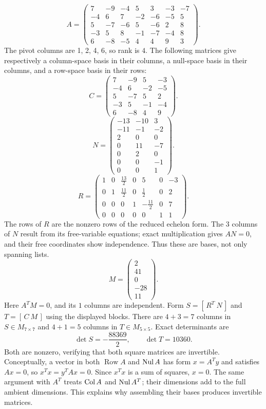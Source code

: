 \[ A=\begin{pmatrix}7&-9&-4&5&3&-3&-7\\-4&6&7&-2&-6&-5&5\\5&-7&-6&5&-6&2&8\\-3&5&8&-1&-7&-4&8\\6&-8&-5&4&4&9&3\end{pmatrix}.\]
The pivot columns are 1, 2, 4, 6, so rank is $4$. The following matrices give respectively a column-space basis in their columns, a null-space basis in their columns, and a row-space basis in their rows:
\[ C=\begin{pmatrix}7&-9&5&-3\\-4&6&-2&-5\\5&-7&5&2\\-3&5&-1&-4\\6&-8&4&9\end{pmatrix}.\]
\[ N=\begin{pmatrix}-13&-10&3\\-11&-1&-2\\2&0&0\\0&11&-7\\0&2&0\\0&0&-1\\0&0&1\end{pmatrix}.\]
\[ R=\begin{pmatrix}1&0&\frac{13}{2}&0&5&0&-3\\0&1&\frac{11}{2}&0&\frac{1}{2}&0&2\\0&0&0&1&- \frac{11}{2}&0&7\\0&0&0&0&0&1&1\end{pmatrix}.\]
The rows of $R$ are the nonzero rows of the reduced echelon form. The $3$ columns of $N$ result from its free-variable equations; exact multiplication gives $AN=0$, and their free coordinates show independence. Thus these are bases, not only spanning lists.
\[ M=\begin{pmatrix}2\\41\\0\\-28\\11\end{pmatrix}.\]
Here $A^TM=0$, and its $1$ columns are independent. Form $S=[\,R^T\ N\,]$ and $T=[\,C\ M\,]$ using the displayed blocks. There are $4+3=7$ columns in $S\in M_{7\times 7}$ and $4+1=5$ columns in $T\in M_{5\times 5}$. Exact determinants are
\[ \det S=- \frac{88369}{2},\qquad\det T=10360.\]
Both are nonzero, verifying that both square matrices are invertible. Conceptually, a vector in both $\operatorname{Row}A$ and $\operatorname{Nul} A$ has form $x=A^Ty$ and satisfies $Ax=0$, so $x^Tx=y^TAx=0$. Since $x^Tx$ is a sum of squares, $x=0$. The same argument with $A^T$ treats $\operatorname{Col} A$ and $\operatorname{Nul} A^T$; their dimensions add to the full ambient dimensions. This explains why assembling their bases produces invertible matrices.

